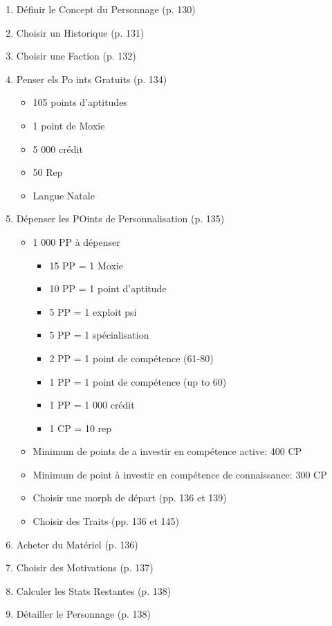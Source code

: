 \begin{enumerate}
   \item Définir le Concept du Personnage (p. 130)
   \item Choisir un Historique (p. 131)
   \item Choisir une Faction (p. 132)
   \item Penser els Po ints Gratuits (p. 134)
      \begin{itemize}
         \item 105 points d'aptitudes
         \item 1 point de Moxie
         \item 5 000 crédit
         \item 50 Rep
         \item Langue Natale
      \end{itemize} 
   \item Dépenser les POints de Personnalisation (p. 135)
      \begin{itemize} 
         \item 1 000 PP à dépenser
            \begin{itemize}
               \item 15 PP = 1 Moxie
               \item 10 PP = 1 point d'aptitude
               \item 5 PP = 1 exploit psi
               \item 5 PP = 1 spécialisation
               \item 2 PP = 1 point de compétence (61-80)
               \item 1 PP = 1 point de compétence (up to 60)
               \item 1 PP = 1 000 crédit
               \item 1 CP = 10 rep
            \end{itemize}
         \item Minimum de points de a investir en compétence active: 400 CP
         \item Minimum de point à investir en compétence de connaissance: 300 CP 
         \item Choisir une morph de départ (pp. 136 et 139) 
         \item Choisir des Traits (pp. 136 et 145) 
      \end{itemize} \item Acheter du Matériel (p. 136)
   \item Choisir des Motivations (p. 137)
   \item Calculer les Stats Restantes (p. 138)
   \item Détailler le Personnage (p. 138)
\end{enumerate} 

